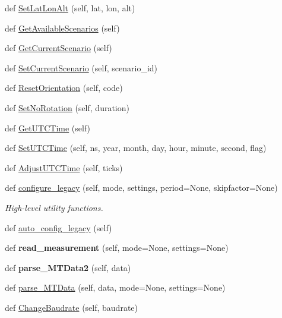 \begin{DoxyCompactItemize}
def \hyperlink{classmtdevice_1_1MTDevice_adb65653ac4a1509c3fbd9122b63365da}{Set\+Lat\+Lon\+Alt} (self, lat, lon, alt)
\item 
def \hyperlink{classmtdevice_1_1MTDevice_ad55a649988c828b49bc2af507c39da93}{Get\+Available\+Scenarios} (self)
\item 
def \hyperlink{classmtdevice_1_1MTDevice_ac63944270e1c85c2c4c9fcc500474ab5}{Get\+Current\+Scenario} (self)
\item 
def \hyperlink{classmtdevice_1_1MTDevice_a94eaa1bb8de52ed69bb20c9ffa404fe8}{Set\+Current\+Scenario} (self, scenario\+\_\+id)
\item 
def \hyperlink{classmtdevice_1_1MTDevice_a29424b8cc73d27252ed151075735c0e5}{Reset\+Orientation} (self, code)
\item 
def \hyperlink{classmtdevice_1_1MTDevice_aec52bfabf3122d033b56d7e596d3c036}{Set\+No\+Rotation} (self, duration)
\item 
def \hyperlink{classmtdevice_1_1MTDevice_aa5a60e82059880b43492ea174ac36d6c}{Get\+U\+T\+C\+Time} (self)
\item 
def \hyperlink{classmtdevice_1_1MTDevice_a8e431e7cfdf17e72d9bdc1eddcf80d43}{Set\+U\+T\+C\+Time} (self, ns, year, month, day, hour, minute, second, flag)
\item 
def \hyperlink{classmtdevice_1_1MTDevice_af18ecf9cbdca13076b655a6b83f8fab2}{Adjust\+U\+T\+C\+Time} (self, ticks)
\item 
def \hyperlink{classmtdevice_1_1MTDevice_a487b8703cde676cd0877e0b07a40ed0c}{configure\+\_\+legacy} (self, mode, settings, period=None, skipfactor=None)
\begin{DoxyCompactList}\small\item\em High-\/level utility functions. \end{DoxyCompactList}\item 
def \hyperlink{classmtdevice_1_1MTDevice_a2f6e1f0e3ca9c5459b97dc1007050c7b}{auto\+\_\+config\+\_\+legacy} (self)
\item 
\mbox{\label{classmtdevice_1_1MTDevice_ac8b5e65c0dbc76a21ce0d783fad0e622}} 
def {\bfseries read\+\_\+measurement} (self, mode=None, settings=None)
\item 
\mbox{\label{classmtdevice_1_1MTDevice_a6e34005b0463c21c75ddc0986600d36d}} 
def {\bfseries parse\+\_\+\+M\+T\+Data2} (self, data)
\item 
def \hyperlink{classmtdevice_1_1MTDevice_a797870c42c7c882a20806279dc984355}{parse\+\_\+\+M\+T\+Data} (self, data, mode=None, settings=None)
\item 
def \hyperlink{classmtdevice_1_1MTDevice_a065580ecd5e3906b8f49c46c1b1510e7}{Change\+Baudrate} (self, baudrate)
\end{DoxyCompactItemize}
